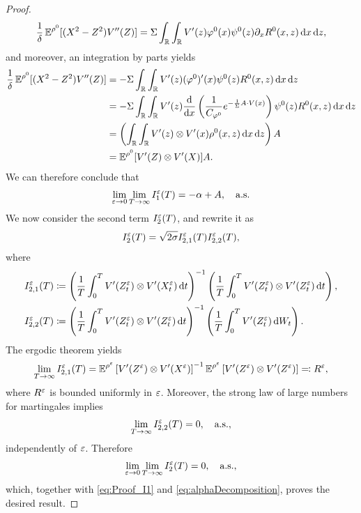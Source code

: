 \documentclass[10pt]{article}
\begin{document}
\begin{proof}
\begin{equation}\label{eq:final_result}
	\frac{1}{\delta} \operatorname{\mathbb{E}}^{\rho^0}[(X^2 - Z^2)V''(Z)] = \Sigma \int_{\mathbb{R}} \int_{\mathbb{R}} V'(z) \varphi^0(x) \psi^0(z) \partial_x R^0(x,z) \,\mathrm{d} x \,\mathrm{d} z,
\end{equation}
and moreover, an integration by parts yields
\begin{equation}
\begin{aligned}
	\frac{1}{\delta} \operatorname{\mathbb{E}}^{\rho^0}[(X^2 - Z^2)V''(Z)] &= -\Sigma \int_{\mathbb{R}} \int_{\mathbb{R}} V'(z) (\varphi^0)'(x) \psi^0(z) R^0(x,z) \,\mathrm{d} x \,\mathrm{d} z\\
	&= -\Sigma \int_{\mathbb{R}} \int_{\mathbb{R}} V'(z) \frac{\mathrm{d}}{\mathrm{d} x} \left ( \frac{1}{C_{\varphi^0}} e^{-\frac{1}{\Sigma} A\cdot V(x)} \right ) \psi^0(z) R^0(x,z) \,\mathrm{d} x \,\mathrm{d} z \\
	&= \left(\int_{\mathbb{R}} \int_{\mathbb{R}} V'(z) \otimes V'(x) \rho^0(x,z) \,\mathrm{d} x \,\mathrm{d} z\right)A\\
	&=  \operatorname{\mathbb{E}}^{\rho^0} [ V'(Z) \otimes V'(X) ]A.
\end{aligned}
\end{equation}
We can therefore conclude that
\begin{equation}\label{eq:Proof_I1}
\lim_{\varepsilon \to 0} \lim_{T \to \infty} I_1^\varepsilon(T) = -\alpha + A, \quad \text{a.s.}
\end{equation}
We now consider the second term $I_2^\varepsilon(T)$, and rewrite it as
\begin{equation}
	I^\varepsilon_2(T) = \sqrt{2\sigma} I_{2,1}^\varepsilon(T)  I_{2,2}^\varepsilon(T),
\end{equation}
where
\begin{equation}
\begin{aligned}
	I_{2,1}^\varepsilon(T) &\coloneqq \left(\frac{1}{T} \int_0^T V'(Z^\varepsilon_t) \otimes V'(X^\varepsilon_t) \,\mathrm{d} t\right)^{-1}\left(\frac{1}{T} \int_0^T V'(Z^\varepsilon_t) \otimes V'(Z^\varepsilon_t) \,\mathrm{d} t\right),\\
	I_{2,2}^\varepsilon(T) &\coloneqq \left(\frac{1}{T} \int_0^T V'(Z^\varepsilon_t) \otimes V'(Z^\varepsilon_t) \,\mathrm{d} t\right)^{-1} \left(\frac1T \int_0^T V'(Z^\varepsilon_t) \,\mathrm{d} W_t\right).
\end{aligned}
\end{equation}
The ergodic theorem yields
\begin{equation}
	\lim_{T \to \infty} I_{2,1}^\varepsilon(T) = \operatorname{\mathbb{E}}^{\rho^\varepsilon}\left[V'(Z^\varepsilon) \otimes V'(X^\varepsilon)\right]^{-1}\operatorname{\mathbb{E}}^{\rho^\varepsilon}\left[V'(Z^\varepsilon) \otimes V'(Z^\varepsilon)\right] \eqqcolon R^\varepsilon,
\end{equation}
where $R^\varepsilon$ is bounded uniformly in $\varepsilon$. Moreover, the strong law of large numbers for martingales implies
\begin{equation}
	\lim_{T \to \infty} I_{2,2}^\varepsilon(T) = 0, \quad \text{a.s.},
\end{equation}
independently of $\varepsilon$. Therefore
\begin{equation}
	\lim_{\varepsilon \to 0}\lim_{T \to \infty} I_2^\varepsilon(T) = 0, \quad \text{a.s.},
\end{equation}
which, together with \eqref{eq:Proof_I1} and \eqref{eq:alphaDecomposition}, proves the desired result.
\end{proof}
\end{document}
